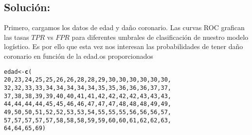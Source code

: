 \documentclass[paper=letter, fontsize=11pt]{scrartcl}\usepackage[]{graphicx}\usepackage[]{xcolor}
\makeatletter
\newcommand{\hlnum}[1]{\textcolor[rgb]{0.686,0.059,0.569}{#1}}%
\newcommand{\hldef}[1]{\textcolor[rgb]{0.345,0.345,0.345}{#1}}%
\newcommand{\hlkwb}[1]{\textcolor[rgb]{0.69,0.353,0.396}{#1}}%
\newcommand{\hlkwd}[1]{\textcolor[rgb]{0.737,0.353,0.396}{\textbf{#1}}}%
\newenvironment{kframe}{%
 \def\at@end@of@kframe{}%
 \ifinner\ifhmode%
  \def\at@end@of@kframe{\end{minipage}}%
  \begin{minipage}{\columnwidth}%
 \fi\fi%
 \def\FrameCommand##1{\hskip\@totalleftmargin \hskip-\fboxsep
 \colorbox{shadecolor}{##1}\hskip-\fboxsep
     \hskip-\linewidth \hskip-\@totalleftmargin \hskip\columnwidth}%
 \MakeFramed {\advance\hsize-\width
   \@totalleftmargin\z@ \linewidth\hsize
   \@setminipage}}%
 {\par\unskip\endMakeFramed%
 \at@end@of@kframe}
\newenvironment{knitrout}{}{} %
\numberwithin{equation}{problemcounter} %
\numberwithin{figure}{problemcounter} %
\numberwithin{table}{problemcounter} %
\numberwithin{subsection}{problemcounter}
\makeatother
\begin{document}
\subsection{\textbf{Solución:}}

Primero, cargamos los datos de edad y daño coronario. Las curvas ROC grafican las tasas $TPR$ vs $FPR$ para diferentes umbrales de clasificación de nuestro modelo logístico. Es por ello que esta vez nos interesan las probabilidades de tener daño coronario en función de la edad.os proporcionados

\begin{knitrout}
\color{fgcolor}\begin{kframe}
\begin{alltt}
\hldef{edad} \hlkwb{<-} \hlkwd{c}\hldef{(}
    \hlnum{20}\hldef{,} \hlnum{23}\hldef{,} \hlnum{24}\hldef{,} \hlnum{25}\hldef{,} \hlnum{25}\hldef{,} \hlnum{26}\hldef{,} \hlnum{26}\hldef{,} \hlnum{28}\hldef{,} \hlnum{28}\hldef{,} \hlnum{29}\hldef{,} \hlnum{30}\hldef{,} \hlnum{30}\hldef{,} \hlnum{30}\hldef{,} \hlnum{30}\hldef{,} \hlnum{30}\hldef{,} \hlnum{30}\hldef{,}
    \hlnum{32}\hldef{,} \hlnum{32}\hldef{,} \hlnum{33}\hldef{,} \hlnum{33}\hldef{,} \hlnum{34}\hldef{,} \hlnum{34}\hldef{,} \hlnum{34}\hldef{,} \hlnum{34}\hldef{,} \hlnum{34}\hldef{,} \hlnum{35}\hldef{,} \hlnum{35}\hldef{,} \hlnum{36}\hldef{,} \hlnum{36}\hldef{,} \hlnum{36}\hldef{,} \hlnum{37}\hldef{,} \hlnum{37}\hldef{,}
    \hlnum{37}\hldef{,} \hlnum{38}\hldef{,} \hlnum{38}\hldef{,} \hlnum{39}\hldef{,} \hlnum{39}\hldef{,} \hlnum{40}\hldef{,} \hlnum{40}\hldef{,} \hlnum{41}\hldef{,} \hlnum{41}\hldef{,} \hlnum{42}\hldef{,} \hlnum{42}\hldef{,} \hlnum{42}\hldef{,} \hlnum{42}\hldef{,} \hlnum{43}\hldef{,} \hlnum{43}\hldef{,} \hlnum{43}\hldef{,}
    \hlnum{44}\hldef{,} \hlnum{44}\hldef{,} \hlnum{44}\hldef{,} \hlnum{44}\hldef{,} \hlnum{45}\hldef{,} \hlnum{45}\hldef{,} \hlnum{46}\hldef{,} \hlnum{46}\hldef{,} \hlnum{47}\hldef{,} \hlnum{47}\hldef{,} \hlnum{47}\hldef{,} \hlnum{48}\hldef{,} \hlnum{48}\hldef{,} \hlnum{48}\hldef{,} \hlnum{49}\hldef{,} \hlnum{49}\hldef{,}
    \hlnum{49}\hldef{,} \hlnum{50}\hldef{,} \hlnum{50}\hldef{,} \hlnum{51}\hldef{,} \hlnum{52}\hldef{,} \hlnum{52}\hldef{,} \hlnum{53}\hldef{,} \hlnum{53}\hldef{,} \hlnum{54}\hldef{,} \hlnum{55}\hldef{,} \hlnum{55}\hldef{,} \hlnum{55}\hldef{,} \hlnum{56}\hldef{,} \hlnum{56}\hldef{,} \hlnum{56}\hldef{,} \hlnum{57}\hldef{,}
    \hlnum{57}\hldef{,} \hlnum{57}\hldef{,} \hlnum{57}\hldef{,} \hlnum{57}\hldef{,} \hlnum{57}\hldef{,} \hlnum{58}\hldef{,} \hlnum{58}\hldef{,} \hlnum{58}\hldef{,} \hlnum{59}\hldef{,} \hlnum{59}\hldef{,} \hlnum{60}\hldef{,} \hlnum{60}\hldef{,} \hlnum{61}\hldef{,} \hlnum{62}\hldef{,} \hlnum{62}\hldef{,} \hlnum{63}\hldef{,}
    \hlnum{64}\hldef{,} \hlnum{64}\hldef{,} \hlnum{65}\hldef{,} \hlnum{69}\hldef{)}


\end{alltt}
\end{kframe}
\end{knitrout}
\end{document}
